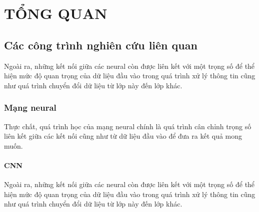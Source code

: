 \chapter{TỔNG QUAN}

\section{Các công trình nghiên cứu liên quan}
Ngoài ra, những kết nối giữa các neural còn được liên kết với một trọng số để thể hiện mức độ quan trọng của dữ liệu đầu vào trong quá trình xử lý thông tin cũng như quá trình chuyển đổi dữ liệu từ lớp này đến lớp khác. 

\subsection{Mạng neural}
Thực chất, quá trình học của mạng neural chính là quá trình cân chỉnh trọng số liên kết giữa các kết nối cũng như từ dữ liệu đầu vào để đưa ra kết quả mong muốn.

\subsubsection{CNN}
Ngoài ra, những kết nối giữa các neural còn được liên kết với một trọng số để thể hiện mức độ quan trọng của dữ liệu đầu vào trong quá trình xử lý thông tin cũng như quá trình chuyển đổi dữ liệu từ lớp này đến lớp khác.

\newpage